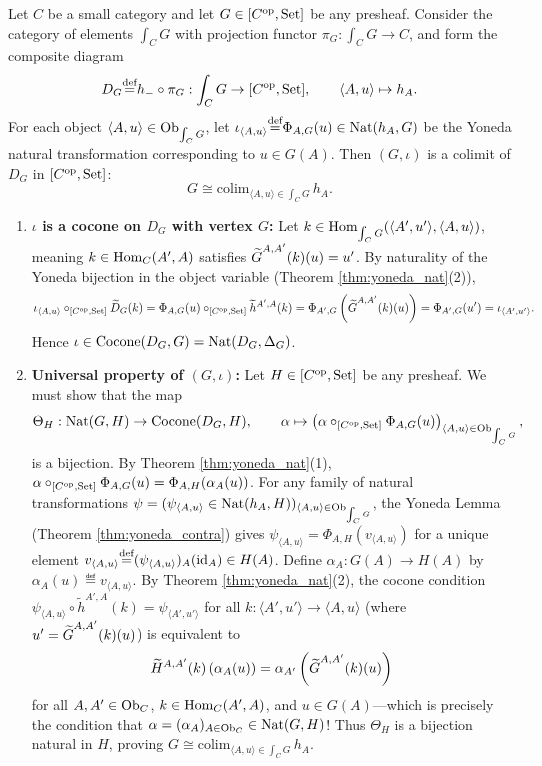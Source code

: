 \documentclass[10pt,a4paper]{article}
\begin{document}
\begin{theorem}\label{thm:density}
Let $C$ be a small category and let $G \in [C^{\textrm{op}}, {\textrm{Set}}]$ be any presheaf. Consider the category of elements $\int_C G$ with projection functor $\pi_G : \int_C G \to C$, and form the composite diagram
$$D_G {\stackrel{{\textrm{def}}}{=}} h_- \circ \pi_G : \int_C G \to [C^{\textrm{op}}, {\textrm{Set}}], \qquad \langle A, u \rangle \mapsto h_A.$$
For each object $\langle A, u \rangle \in {\textrm{Ob}}_{\int_C G}$, let $\iota_{\langle A, u \rangle} {\stackrel{{\textrm{def}}}{=}} \Phi_{A,G}(u) \in {\textrm{Nat}}(h_A, G)$ be the Yoneda natural transformation corresponding to $u \in G(A)$. Then $(G, \iota)$ is a colimit of $D_G$ in $[C^{\textrm{op}}, {\textrm{Set}}]$:
$$G \cong \mathrm{colim}_{\langle A, u \rangle \in \int_C G}\, h_A.$$
\end{theorem}
\myprf
\begin{enumerate}
\item \textbf{$\iota$ is a cocone on $D_G$ with vertex $G$:} Let $k \in {\textrm{Hom}}_{\int_C G}(\langle A', u' \rangle, \langle A, u \rangle)$, meaning $k \in {\textrm{Hom}}_C(A', A)$ satisfies ${\widetilde{G}\textrm{}}^{A,A'}(k)(u) = u'$. By naturality of the Yoneda bijection in the object variable (Theorem \ref{thm:yoneda_nat}(2)),
$$\iota_{\langle A, u \rangle} \circ_{[C^{\textrm{op}},{\textrm{Set}}]} \widetilde{D}_G(k) = \Phi_{A,G}(u) \circ_{[C^{\textrm{op}},{\textrm{Set}}]} \widetilde{h}^{A',A}(k) = \Phi_{A',G}\left({\widetilde{G}\textrm{}}^{A,A'}(k)(u)\right) = \Phi_{A',G}(u') = \iota_{\langle A', u' \rangle}.$$
Hence $\iota \in \mathrm{Cocone}(D_G, G) = {\textrm{Nat}}(D_G, \Delta_G)$.
\item \textbf{Universal property of $(G, \iota)$:} Let $H \in [C^{\textrm{op}}, {\textrm{Set}}]$ be any presheaf. We must show that the map
$$\Theta_H : {\textrm{Nat}}(G, H) \to \mathrm{Cocone}(D_G, H), \qquad \alpha \mapsto \left(\alpha \circ_{[C^{\textrm{op}},{\textrm{Set}}]} \Phi_{A,G}(u)\right)_{\langle A, u \rangle \in {\textrm{Ob}}_{\int_C G}},$$
is a bijection. By Theorem \ref{thm:yoneda_nat}(1), $\alpha \circ_{[C^{\textrm{op}},{\textrm{Set}}]} \Phi_{A,G}(u) = \Phi_{A,H}(\alpha_A(u))$. For any family of natural transformations $\psi = (\psi_{\langle A, u \rangle} \in {\textrm{Nat}}(h_A, H))_{\langle A, u \rangle \in {\textrm{Ob}}_{\int_C G}}$, the Yoneda Lemma (Theorem \ref{thm:yoneda_contra}) gives $\psi_{\langle A, u \rangle} = \Phi_{A,H}(v_{\langle A, u \rangle})$ for a unique element $v_{\langle A, u \rangle} {\stackrel{{\textrm{def}}}{=}} (\psi_{\langle A, u \rangle})_A({\textrm{id}}_A) \in H(A)$. Define $\alpha_A : G(A) \to H(A)$ by $\alpha_A(u) \eqdef v_{\langle A, u \rangle}$. By Theorem \ref{thm:yoneda_nat}(2), the cocone condition $\psi_{\langle A, u \rangle} \circ \widetilde{h}^{A',A}(k) = \psi_{\langle A', u' \rangle}$ for all $k : \langle A', u' \rangle \to \langle A, u \rangle$ (where $u' = {\widetilde{G}\textrm{}}^{A,A'}(k)(u)$) is equivalent to
$$\widetilde{H}^{A,A'}(k)\left(\alpha_A(u)\right) = \alpha_{A'}\left({\widetilde{G}\textrm{}}^{A,A'}(k)(u)\right)$$
for all $A, A' \in {\textrm{Ob}}_C$, $k \in {\textrm{Hom}}_C(A', A)$, and $u \in G(A)$---which is precisely the condition that $\alpha = (\alpha_A)_{A \in {\textrm{Ob}}_C} \in {\textrm{Nat}}(G, H)$! Thus $\Theta_H$ is a bijection natural in $H$, proving $G \cong \mathrm{colim}_{\langle A, u \rangle \in \int_C G}\, h_A$.
\end{enumerate}
\myqed
\end{document}
